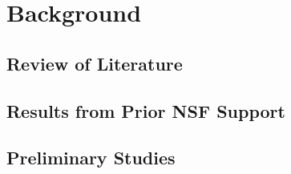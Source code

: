 \section{Background}
\subsection{Review of Literature}



\subsection{Results from Prior NSF Support}



\subsection{Preliminary Studies}

